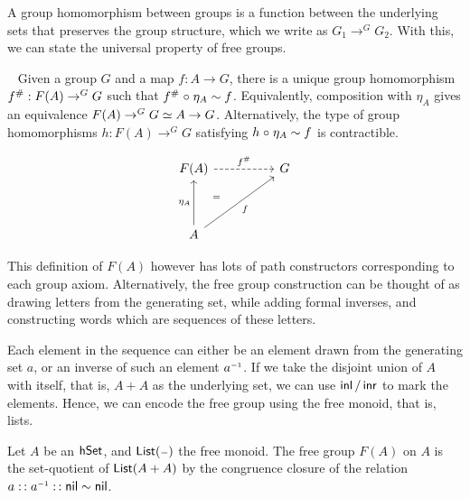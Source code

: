 A group homomorphism between groups is a function between the underlying sets
that preserves the group structure, which we write as $G_1 \to^G G_2$. With
this, we can state the universal property of free groups.

\begin{proposition}~\label{prop:free-groups}
  Given a group $G$ and a map $f : A \to G$, there is a unique group
  homomorphism ${f}^\# : F(A) \to^G G$ such that ${f}^\# \mathrel{\circ} \eta_A
  \mathrel{\sim} f$. Equivalently, composition with $\eta_A$ gives an equivalence $F(A)
  \to^G G \mathrel{\simeq} A \to G$. Alternatively, the type of group homomorphisms $h :
  F(A) \to^G G$ satisfying $h \mathrel{\circ} \eta_A \mathrel{\sim} f$ is contractible.

\[\begin{tikzcd}
	{F(A)} && G \\
	\\
	A
	\arrow[""{name=0, anchor=center, inner sep=0}, "{\eta_A}", from=3-1, to=1-1]
	\arrow[""{name=1, anchor=center, inner sep=0}, "f"', from=3-1, to=1-3]
	\arrow["{\extend{f}}", dashed, from=1-1, to=1-3]
	\arrow["\id", Rightarrow, draw=none, from=0, to=1]
\end{tikzcd}\]
\end{proposition}

This definition of $F(A)$ however has lots of path constructors corresponding to
each group axiom. Alternatively, the free group construction can be thought of
as drawing letters from the generating set, while adding formal inverses, and
constructing words which are sequences of these letters. 

Each element in the sequence can either be an element drawn from the generating
set $a$, or an inverse of such an element $\inv{a}$. If we take the disjoint
union of $A$ with itself, that is, $A + A$ as the underlying set, we can use
$\operatorname{\mathsf{inl}}/\operatorname{\mathsf{inr}}$ to mark the elements. Hence, we can encode the free group using the
free monoid, that is, lists.

\begin{definition}
  Let $A$ be an $\mathsf{hSet}$, and $\List[\blank]$ the free monoid. The free group
  $F(A)$ on $A$ is the set-quotient of $\List[A + A]$ by the congruence closure
  of the relation $a \cons \inv{a} \cons \nil \sim \nil$.
\end{definition}

